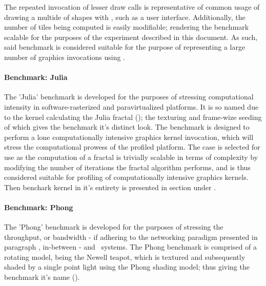 The repeated invocation of lesser draw calls is representative of common usage of drawing a multide of shapes with \dvttermopengl , such as a user interface. Additionally, the number of tiles being computed is easily modifiable; rendering the benchmark scalable for the purposes of the experiment described in this document. As such, said benchmark is considered suitable for the purpose of representing a large number of graphics invocations using \dvttermopenglestwopointo .

\paragraph{Benchmark: Julia}
\label{par:methodologyexperiment_benchmarking_benchmarkjulia}
The 'Julia' benchmark is developed for the purposes of stressing computational intensity in software-rasterized and paravirtualized platforms.
It is so named due to the kernel calculating the Julia fractal (); the texturing and frame-wize seeding of which gives the benchmark it's distinct look.
The benchmark is designed to perform a lone computationally intensive graphics kernel invocation, which will stress the computational prowess of the profiled platform.
The case is selected for use as the computation of a fractal is trivially scalable in terms of complexity by modifying the number of iterations the fractal algorithm performs, and is thus considered suitable for profiling of computationally intensive graphics kernels.
Then benchark kernel in it's entirety is presented in section
 under .

\paragraph{Benchmark: Phong}
\label{par:methodologyexperiment_benchmarking_benchmarkphong}
The 'Phong' benchmark is developed for the purposes of stressing the throughput, or bandwidth - if adhering to the networking paradigm presented in paragraph , in-between \dvttermtarget - and \dvttermhost\ systems.
The Phong benchmark is comprised of a rotating model, being the Newell teapot, which is textured and subsequently shaded by a single point light using the Phong shading model; thus giving the benchmark it's name ().


